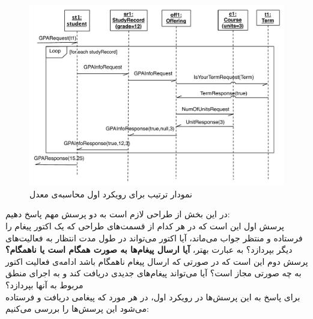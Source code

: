\begin{figure}
    \begin{center}
	\includegraphics[width=16cm]{4-ProposedFramework/Figures/gpa_1_sequence.pdf}
    \end{center}
    \caption{\label{fig:gpa1_sequence} نمودار ترتیب برای رویکرد اول محاسبه‌ی معدل }
\end{figure}
\FloatBarrier
در این بخش از طراحی لازم است به دو پرسش مهم پاسخ دهیم:\\
پرسش اول این است که در هر کدام از قسمت‌های طراحی که یک اکتور پیغام را فرستاده و منتظر جواب می‌ماند، آیا اکتور می‌تواند در طول مدت انتظار به فعالیت‌های دیگر بپردازد؟ به عبارت بهتر، \textbf{آیا ارسال پیغام‌ها به صورت همگام است یا ناهمگام؟}\\
پرسش دوم این است که در صورتی که ارسال پیغام ناهمگام باشد ادامه‌ی فعالیت اکتور به چه صورتی مجاز است؟ آیا می‌تواند پیغام‌های جدیدی دریافت کند و به اجرای منطق مربوط به آنها بپردازد؟\\
برای پاسخ به این پرسش‌ها در رویکرد اول، در هر مورد که پیغامی دریافت و فرستاده می‌شود این پرسش‌ها را بررسی می‌کنیم:
